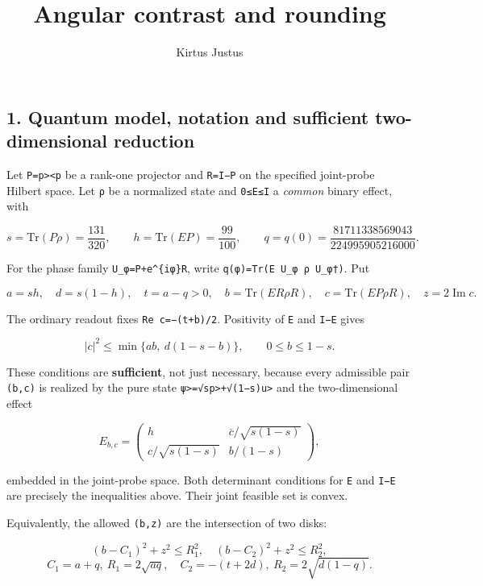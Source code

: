 \documentclass[
  10pt,
  a4paper,
]{article}
\title{Angular contrast and rounding}
\author{Kirtus Justus}
\date{}
\begin{document}
\maketitle

\subsection{1. Quantum model, notation and sufficient two-dimensional reduction}\label{quantum-model-notation-and-sufficient-two-dimensional-reduction}

Let \texttt{P=\textbar{}p\textgreater{}\textless{}p\textbar{}} be a rank-one projector and \texttt{R=I−P} on the specified joint-probe Hilbert space. Let \texttt{ρ} be a normalized state and \texttt{0≤E≤I} a \emph{common} binary effect, with

\[
 s=\mathrm{Tr}(P\rho)=\frac{131}{320},\qquad h=\mathrm{Tr}(EP)=\frac{99}{100},\qquad
 q=q(0)=\frac{81711338569043}{224995905216000}.
\]

For the phase family \texttt{U\_φ=P+e\^{}\{iφ\}R}, write \texttt{q(φ)=Tr(E\ U\_φ\ ρ\ U\_φ†)}. Put

\[
 a=sh,\quad d=s(1-h),\quad t=a-q>0,\quad
 b=\mathrm{Tr}(E R\rho R),\quad c=\mathrm{Tr}(E P\rho R),\quad z=2\operatorname{Im}c.
\]

The ordinary readout fixes \texttt{Re\ c=−(t+b)/2}. Positivity of \texttt{E} and \texttt{I−E} gives

\[
 |c|^2\le\min\{ab,\ d(1-s-b)\},\qquad 0\le b\le 1-s.
\]

These conditions are \textbf{sufficient}, not just necessary, because every admissible pair \texttt{(b,c)} is realized by the pure state \texttt{\textbar{}ψ\textgreater{}=√s\textbar{}p\textgreater{}+√(1−s)\textbar{}u\textgreater{}} and the two-dimensional effect

\[
 E_{b,c}=\begin{pmatrix}
 h & \overline c/\sqrt{s(1-s)}\\
 c/\sqrt{s(1-s)} & b/(1-s)
 \end{pmatrix},
\]

embedded in the joint-probe space. Both determinant conditions for \texttt{E} and \texttt{I−E} are precisely the inequalities above. Their joint feasible set is convex.

Equivalently, the allowed \texttt{(b,z)} are the intersection of two disks:

\[
 (b-C_1)^2+z^2\le R_1^2,\quad (b-C_2)^2+z^2\le R_2^2,
\] \[
 C_1=a+q,\ R_1=2\sqrt{aq},\quad
 C_2=-(t+2d),\ R_2=2\sqrt{d(1-q)}.
\]
\end{document}
